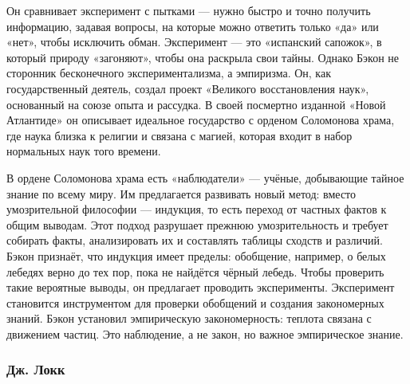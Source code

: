 Он сравнивает эксперимент с пытками --- нужно быстро и точно получить информацию, задавая вопросы, на которые можно ответить только «да» или «нет», чтобы исключить обман. Эксперимент --- это «испанский сапожок», в который природу «загоняют», чтобы она раскрыла свои тайны.
Однако Бэкон не сторонник бесконечного экспериментализма, а эмпиризма. Он, как государственный деятель, создал проект «Великого восстановления наук», основанный на союзе опыта и рассудка. В своей посмертно изданной «Новой Атлантиде» он описывает идеальное государство с орденом Соломонова храма, где наука близка к религии и связана с магией, которая входит в набор нормальных наук того времени.

В ордене Соломонова храма есть «наблюдатели» --- учёные, добывающие тайное знание по всему миру. Им предлагается развивать новый метод: вместо умозрительной философии --- индукция, то есть переход от частных фактов к общим выводам. Этот подход разрушает прежнюю умозрительность и требует собирать факты, анализировать их и составлять таблицы сходств и различий. Бэкон признаёт, что индукция имеет пределы: обобщение, например, о белых лебедях верно до тех пор, пока не найдётся чёрный лебедь.
Чтобы проверить такие вероятные выводы, он предлагает проводить эксперименты. Эксперимент становится инструментом для проверки обобщений и создания закономерных знаний. Бэкон установил эмпирическую закономерность: теплота связана с движением частиц. Это наблюдение, а не закон, но важное эмпирическое знание.


\subsubsection{Дж. Локк}

